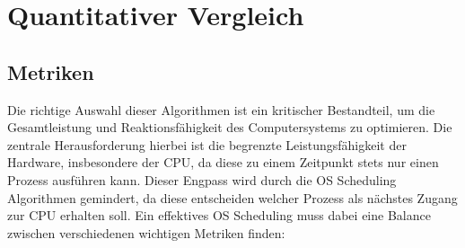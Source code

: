 \chapter{Quantitativer Vergleich}

\section{Metriken}
Die richtige Auswahl dieser Algorithmen ist ein kritischer Bestandteil, um die Gesamtleistung und Reaktionsfähigkeit des Computersystems zu optimieren. Die zentrale Herausforderung hierbei ist die begrenzte Leistungsfähigkeit der Hardware, insbesondere der \ac{CPU}, da diese zu einem Zeitpunkt stets nur einen Prozess ausführen kann. Dieser Engpass wird durch die OS Scheduling Algorithmen gemindert, da diese entscheiden welcher Prozess als nächstes Zugang zur \ac{CPU} erhalten soll. Ein effektives OS Scheduling muss dabei eine Balance zwischen verschiedenen wichtigen Metriken finden:

